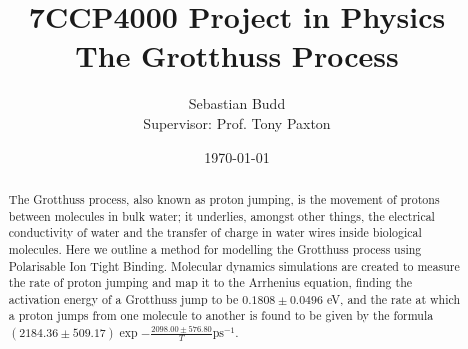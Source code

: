 \documentclass{article}
\title{7CCP4000 Project in Physics\\ 
	\huge \textbf{The Grotthuss Process}\\ }
\date{\today}
\author{Sebastian Budd\\Supervisor: Prof. Tony Paxton}
\begin{document}
  
  \maketitle

\begin{abstract}
The Grotthuss process, also known as proton jumping, is the movement of protons between molecules in bulk water; it underlies, amongst other things, the electrical conductivity of water and the transfer of charge in water wires inside biological molecules. Here we outline a method for modelling the Grotthuss process using Polarisable Ion Tight Binding. Molecular dynamics simulations are created to measure the rate of proton jumping and map it to the Arrhenius equation, finding the activation energy of a Grotthuss jump to be $0.1808 \pm 0.0496$ eV, and the rate at which a proton jumps from one molecule to another is found to be given by the formula $(2184.36 \pm 509.17)\exp{-\frac{2098.00 \pm 576.80}{T}} \text{ps}^{-1}$.
\end{abstract}
	
\newpage
\setcounter{page}{2}

\tableofcontents

\newpage
\end{document}
